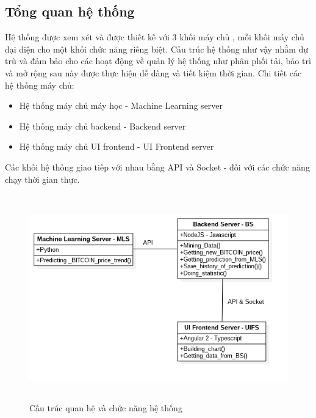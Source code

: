 \subsection{Tổng quan hệ thống}
Hệ thống được xem xét và được thiết kế với 3 khối máy chủ , mỗi khối máy chủ đại 
diện cho một khối chức năng riêng biệt. Cấu trúc hệ thống như vậy nhằm dự trù và đảm bảo 
cho các hoạt động về quản lý hệ thống như phân phối tải, bảo trì và mở rộng sau 
này được thực hiện dễ dàng và tiết kiệm thời gian. Chi tiết các hệ thống máy chủ:
\begin{itemize}
\item Hệ thống máy chủ máy học - Machine Learning server
\item Hệ thống máy chủ backend - Backend server
\item Hệ thống máy chủ UI frontend - UI Frontend server
\end{itemize}
Các khối hệ thống giao tiếp với nhau bằng API và Socket - đối với các chức năng
chạy thời gian thực.\\
\begin{figure}[h!]
\centering
\includegraphics[height=3.5in, keepaspectratio=true]{system.png}
\caption{Cấu trúc quan hệ và chức năng hệ thống}
\end{figure}
